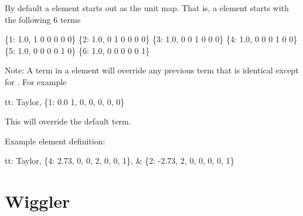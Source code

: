 {{By default a  element starts out as the unit map. 
That is, a  element starts with the following 6 terms
\begin{example}
  \{1: 1.0, 1 0 0 0 0 0\}
  \{2: 1.0, 0 1 0 0 0 0\}
  \{3: 1.0, 0 0 1 0 0 0\}
  \{4: 1.0, 0 0 0 1 0 0\}
  \{5: 1.0, 0 0 0 0 1 0\}
  \{6: 1.0, 0 0 0 0 0 1\}
\end{example}
Note: A term in a  element will override any previous term
that is identical except for . For example
\begin{example}
  tt: Taylor, \{1:  0.0   1, 0, 0, 0, 0, 0\} 
\end{example}
This will override the default  term.

Example  element definition:
\begin{example}
  tt: Taylor, \{4:  2.73, 0, 0, 2, 0, 0, 1\}, &
              \{2: -2.73, 2, 0, 0, 0, 0, 1\}
\end{example}

\section{Wiggler} 
\label{s:wig}

}}
